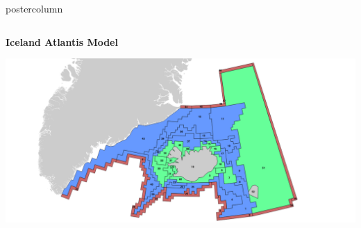 \documentclass[final,hyperref={pdfpagelabels=false}]{beamer}
\begin{document}
\begin{frame}
\begin{columns}
\begin{column}{1\textwidth}
\begin{beamercolorbox}[center,wd=\textwidth]{postercolumn}
\begin{minipage}[T]{.98\textwidth}
{\begin{block}{}
\begin{columns}
\begin{column}{.49\textwidth}
               \vspace{.5cm}
               \centering \textbf{Iceland Atlantis Model}
               \vspace{1cm}
               
               \includegraphics[scale = .5]{images/atlantis_with_layers_colored.png}
               \end{column}
              \end{columns}    
                       
            \end{block}

          
          \vspace{1cm}
            \begin{block}{}
            \begin{columns}
            \begin{column}{.85\textwidth}
            

\end{column}
\end{columns}
\end{block}}
\end{minipage}
\end{beamercolorbox}
\end{column}
\end{columns}
\end{frame}
\end{document}
